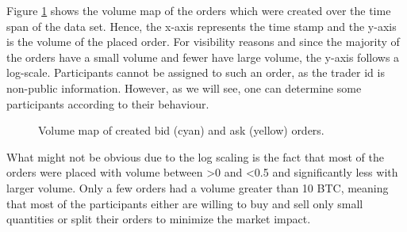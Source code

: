 Figure \ref{fig:data-volmap-crated} shows the volume map of the orders which were created over the time span of the data set.
Hence, the x-axis represents the time stamp and the y-axis is the volume of the placed order.
For visibility reasons and since the majority of the orders have a small volume and fewer have large volume, the y-axis follows a log-scale.
Participants cannot be assigned to such an order, as the trader id is non-public information.
However, as we will see, one can determine some participants according to their behaviour.

\begin{figure}[H]
    \centering
    \caption{Volume map of created bid (cyan) and ask (yellow) orders.}
    \label{fig:data-volmap-crated}
\end{figure}

What might not be obvious due to the log scaling is the fact that most of the orders were placed with volume between >0 and <0.5 and significantly less with larger volume.
Only a few orders had a volume greater than 10 BTC, meaning that most of the participants either are willing to buy and sell only small quantities or split their orders to minimize the market impact.


